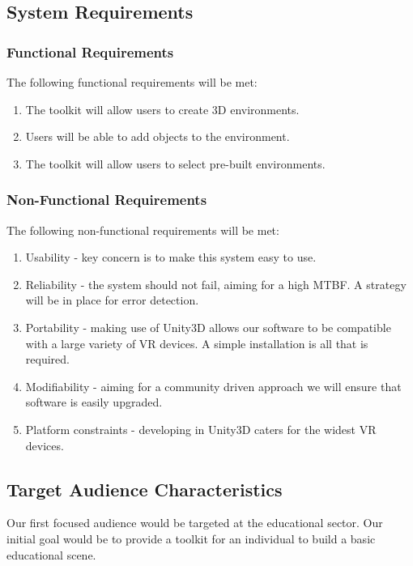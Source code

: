 \subsection{System Requirements}

	\subsubsection{Functional Requirements}
	
	The following functional requirements will be met:
  	
  		\begin{enumerate}
			\item The toolkit will allow users to create 3D environments.
			\item Users will be able to add objects to the environment.
			\item The toolkit will allow users to select pre-built environments.
		\end{enumerate}

	\subsubsection{Non-Functional Requirements}

	The following non-functional requirements will be met:

		\begin{enumerate}
  			\item Usability - key concern is to make this system easy to use.
  			\item Reliability - the system should not fail, aiming for a high MTBF. A strategy will be in place for error detection.
  			\item Portability - making use of Unity3D allows our software to be compatible with a large variety of VR devices. A simple installation is all that is required.
  			\item Modifiability - aiming for a community driven approach we will ensure that software is easily upgraded.
  			\item Platform constraints - developing in Unity3D caters for the widest VR devices.  			
		\end{enumerate}

\subsection{Target Audience Characteristics}

	Our first focused audience would be targeted at the educational sector. Our initial goal would be to provide a toolkit for an individual to build a basic educational scene.

